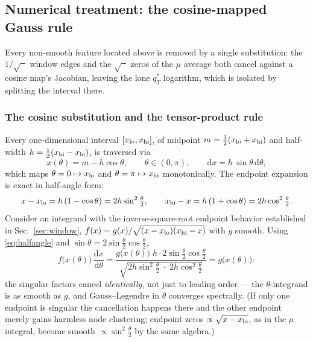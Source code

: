 \documentclass[11pt]{article}
\begin{document}
\subsection{Numerical treatment: the cosine-mapped Gauss rule}
\label{sec:kernel-numeric}

Every non-smooth feature located above is removed by a single substitution:
the $1/\sqrt{\phantom{x}}$ window edges and the $\sqrt{\phantom{x}}$ zeros of
the $\mu$ average both cancel against a cosine map's Jacobian, leaving the
lone $q_T^{*}$ logarithm, which is isolated by splitting the interval there.

\subsubsection{The cosine substitution and the tensor-product rule}
\label{sec:cosmap}

Every one-dimensional interval $[x_{\rm lo},x_{\rm hi}]$, of midpoint
$m=\tfrac12(x_{\rm lo}+x_{\rm hi})$ and half-width
$h=\tfrac12(x_{\rm hi}-x_{\rm lo})$, is traversed via
\begin{equation}
x(\theta)=m-h\cos\theta,
\qquad \theta\in(0,\pi),
\qquad
\mathrm{d}x=h\,\sin\theta\,\mathrm{d}\theta ,
\label{eq:cosmap}
\end{equation}
which maps $\theta=0\mapsto x_{\rm lo}$ and $\theta=\pi\mapsto
x_{\rm hi}$ monotonically.  The endpoint expansion is exact in
half-angle form:
\begin{equation}
x-x_{\rm lo}=h\,(1-\cos\theta)=2h\sin^{2}\tfrac{\theta}{2},
\qquad
x_{\rm hi}-x=h\,(1+\cos\theta)=2h\cos^{2}\tfrac{\theta}{2}.
\label{eq:halfangle}
\end{equation}
Consider an integrand with the inverse-square-root endpoint behavior
established in Sec.~\ref{sec:window},
$f(x)=g(x)/\sqrt{(x-x_{\rm lo})(x_{\rm hi}-x)}$ with $g$ smooth.  Using
\eqref{eq:halfangle} and $\sin\theta=2\sin\tfrac\theta2\cos\tfrac\theta2$,
\begin{equation}
f\big(x(\theta)\big)\,\frac{\mathrm{d}x}{\mathrm{d}\theta}
=\frac{g\big(x(\theta)\big)\; h\cdot2\sin\tfrac\theta2\cos\tfrac\theta2}
{\sqrt{2h\sin^{2}\tfrac\theta2\;\cdot\;2h\cos^{2}\tfrac\theta2}}
=g\big(x(\theta)\big):
\label{eq:cancel}
\end{equation}
the singular factors cancel \emph{identically}, not just to leading
order --- the $\theta$-integrand is as smooth as $g$, and Gauss--Legendre
in $\theta$ converges spectrally.  (If only one endpoint is singular the
cancellation happens there and the other endpoint merely gains harmless
node clustering; endpoint zeros $\propto\sqrt{x-x_{\rm lo}}$, as in the
$\mu$ integral, become smooth $\propto\sin^{2}\tfrac\theta2$ by the same
algebra.)
\end{document}
